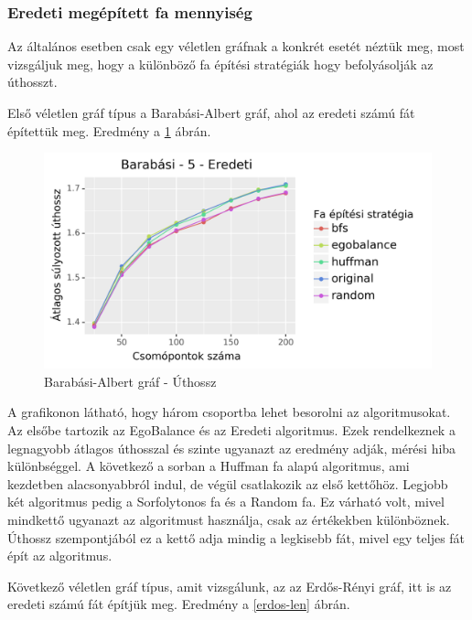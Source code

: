 \documentclass[12pt]{report}
\begin{document}
\subsubsection{Eredeti megépített fa mennyiség}

Az általános esetben csak egy véletlen gráfnak a konkrét esetét néztük meg, most vizsgáljuk meg, hogy a különböző fa építési stratégiák hogy befolyásolják az úthosszt.

Első véletlen gráf típus a Barabási-Albert gráf, ahol az eredeti számú fát építettük meg. 
Eredmény a \ref{barabasi-len} ábrán.

\begin{figure}[H]
	\begin{center}
		\includegraphics[width=0.9\linewidth]{pictures/barabasi_len_e.png}
		\caption{Barabási-Albert gráf - Úthossz}
		\label{barabasi-len}
	\end{center}
\end{figure}

A grafikonon látható, hogy három csoportba lehet besorolni az algoritmusokat. 
Az elsőbe tartozik az EgoBalance és az Eredeti algoritmus.
Ezek rendelkeznek a legnagyobb átlagos úthosszal és szinte ugyanazt az eredmény adják, mérési hiba különbséggel.
A következő a sorban a Huffman fa alapú algoritmus, ami kezdetben alacsonyabbról indul, de végül csatlakozik az első kettőhöz.
Legjobb két algoritmus pedig a Sorfolytonos fa és a Random fa.
Ez várható volt, mivel mindkettő ugyanazt az algoritmust használja, csak az értékekben különböznek.
Úthossz szempontjából ez a kettő adja mindig a legkisebb fát, mivel egy teljes fát épít az algoritmus.


Következő véletlen gráf típus, amit vizsgálunk, az az Erdős-Rényi gráf, itt is az eredeti számú fát építjük meg.
Eredmény a \ref{erdos-len} ábrán.
\end{document}
